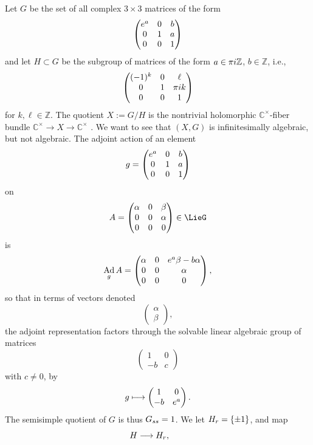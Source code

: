 \documentclass[11pt]{article}
\numberwithin{equation}{section}
\providecommand{\C}{\mathbb{C}}
\numberwithin{equation}{section}
\renewcommand{\C}{\mathbb{C}}
\newcommand{\Z}{\mathbb{Z}}
\DeclareMathOperator{\Ad}{Ad}
\begin{document}
\begin{Example}
Let $G$ be the set of all complex $3 \times 3$ matrices of the form
\[
\begin{pmatrix}
{\rm e}^a & 0 & b \\
0 & 1 & a \\
0 & 0 & 1
\end{pmatrix}
\]
and let $H \subset G$ be the subgroup of matrices of the form $a \in \pi {\rm i} \Z$, $b \in \Z$, i.e.,
\[
\begin{pmatrix}
(-1)^k & 0 & \ell \\
0 & 1 & \pi {\rm i} k \\
0 & 0 & 1
\end{pmatrix}
\]
for $k,\ell \in \Z$.
The quotient $X := G/H$ is the nontrivial holomorphic $\C^{\times}$-fiber bundle $\C^{\times} \to X
 \to \C^{\times}$ \cite[Section~11]{McKay:2015}.
We want to see that $(X, G)$ is infinitesimally algebraic, but not algebraic.
The adjoint action of an element
\[
g =
\begin{pmatrix}
{\rm e}^a & 0 & b \\
0 & 1 & a \\
0 & 0 & 1
\end{pmatrix}
\]
on
\[
A=
\begin{pmatrix}
\alpha & 0 & \beta \\
0 & 0 & \alpha \\
0 & 0 & 0
\end{pmatrix}
\in \LieG
\]
is
\[
\Ad_g A =
\begin{pmatrix}
\alpha & 0 & {\rm e}^a\beta-b\alpha \\
0 & 0 & \alpha \\
0 & 0 & 0
\end{pmatrix},
\]
so that in terms of vectors denoted
\[
\begin{pmatrix}
\alpha \\
\beta
\end{pmatrix},
\]
the adjoint representation factors through the solvable linear algebraic group of matrices
\[
\begin{pmatrix}
1 & 0 \\
-b & c
\end{pmatrix}
\]
with $c\ne 0$, by
\[
g \longmapsto
\begin{pmatrix}
1 & 0 \\
-b & {\rm e}^a
\end{pmatrix}.
\]
The semisimple quotient of $G$ is thus $G_{\rm ss} = 1$.
We let $\red{H} = \{\pm 1\}$, and map
\[
H \longrightarrow \red{H}, \qquad
\]
\end{Example}
\end{document}
